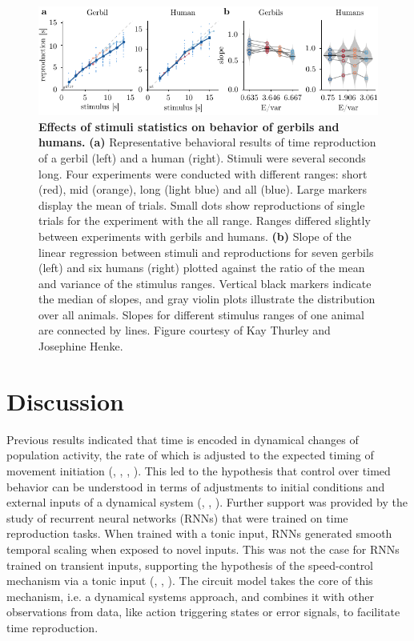 \documentclass[10pt, a4paper]{article}
\begin{document}

\begin{figure}[ht]
	\centering
	\includegraphics{figures/underestimation.pdf}
	\caption{\textbf{Effects of stimuli statistics on behavior of gerbils and humans.}
	\textbf{(a)} Representative behavioral results of time reproduction of a gerbil (left) and a human (right). Stimuli were several seconds long. Four experiments were conducted with different ranges: short (red), mid (orange), long (light blue) and all (blue). Large markers display the mean of trials. Small dots show reproductions of single trials for the experiment with the all range.
	Ranges differed slightly between experiments with gerbils and humans. 
	\textbf{(b)} Slope of the linear regression between stimuli and reproductions for seven gerbils (left) and six humans (right) plotted against the ratio of the mean and variance of the stimulus ranges. Vertical black markers indicate the median of slopes, and gray violin plots illustrate the distribution over all animals. Slopes for different stimulus ranges of one animal are connected by lines. 
	Figure courtesy of Kay Thurley and Josephine Henke.
	}
\label{fig:underestimation}
\end{figure}

\clearpage

\section{Discussion}
Previous results indicated that time is encoded in dynamical changes of population activity, the rate of which is adjusted to the expected timing of movement initiation (\cite{Remington2018}, \cite{Wang2018}, \cite{Egger2019}, \cite{Henke2021}).
This led to the hypothesis that control over timed behavior can be understood in terms of adjustments to initial conditions and external inputs of a dynamical system (\cite{Remington2018}, \cite{Wang2018}, \cite{Tsao2022}).
Further support was provided by the study of recurrent neural networks (RNNs) that were trained on time reproduction tasks. When trained with a tonic input, RNNs generated smooth temporal scaling when exposed to novel inputs. This was not the case for RNNs trained on transient inputs, supporting the hypothesis of the speed-control mechanism via a tonic input (\cite{Remington2018}, \cite{Bi2020}, \cite{Zhou2022}).
The circuit model takes the core of this mechanism, i.e. a dynamical systems approach, and combines it with other observations from data, like action triggering states or error signals, to facilitate time reproduction. 
\end{document}
